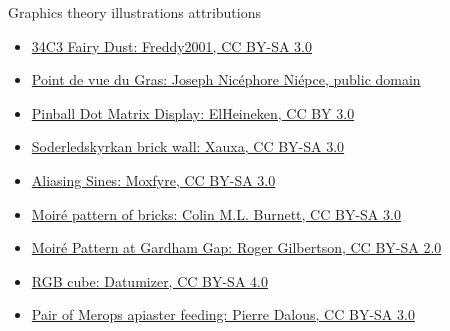 \begin{frame}{Graphics theory illustrations attributions}
  \small
  \begin{itemize}
  \item \href{https://commons.wikimedia.org/wiki/File:2017-12-28_Leipzig,_34c3,_Fairy_Dust_(freddy2001).jpg}{34C3 Fairy Dust: Freddy2001, CC BY-SA 3.0}
  \item \href{https://commons.wikimedia.org/wiki/File:View_from_the_Window_at_Le_Gras,_Joseph_Nic\%C3\%A9phore_Ni\%C3\%A9pce.jpg}{Point de vue du Gras: Joseph Nicéphore Niépce, public domain}
  \item \href{https://commons.wikimedia.org/wiki/File:Pinball_Dot_Matrix_Display_-_Demolition_Man.JPG}{Pinball Dot Matrix Display: ElHeineken, CC BY 3.0}
  \item \href{https://commons.wikimedia.org/wiki/File:Soderledskyrkan_brick_wall.jpg}{Soderledskyrkan brick wall: Xauxa, CC BY-SA 3.0}
  \item \href{https://commons.wikimedia.org/wiki/File:AliasingSines.svg}{Aliasing Sines: Moxfyre, CC BY-SA 3.0}
  \item \href{https://commons.wikimedia.org/wiki/File:Moire_pattern_of_bricks.jpg}{Moiré pattern of bricks: Colin M.L. Burnett, CC BY-SA 3.0}
  \item \href{https://commons.wikimedia.org/wiki/File:Moire_pattern_of_bricks_small.jpg}{Moiré Pattern at Gardham Gap: Roger Gilbertson, CC BY-SA 2.0}
  \item \href{https://commons.wikimedia.org/wiki/File:RGBCube_a.svg}{RGB cube: Datumizer, CC BY-SA 4.0}
  \item \href{https://commons.wikimedia.org/wiki/File:Pair_of_Merops_apiaster_feeding.jpg}{Pair of Merops apiaster feeding: Pierre Dalous, CC BY-SA 3.0}
  \end{itemize}
\end{frame}

